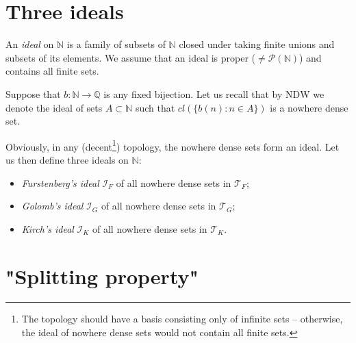 \documentclass{amsart}
\theoremstyle{definition}
\theoremstyle{definition}
\newcommand{\N}{{\mathbb N}}
\newcommand{\Q}{{\mathbb Q}}
\newcommand{\I}{\mathcal I}
\newcommand{\T}{\mathcal{T}}
\begin{document}

\section*{Three ideals}

An \emph{ideal} on $\N$ is a family of subsets of $\N$ closed under taking finite unions and subsets of its elements. We assume that an ideal is proper ($\neq \mathcal{P}(\N)$) and contains all finite sets.



Suppose that $b\colon\N\to\Q$ is any fixed bijection.
Let us recall that by $\mathrm{NDW}$ we denote the ideal of sets
$A \subset \N$ such that $\mathit{cl}(\lbrace b(n)\colon n \in A\rbrace)$
is a nowhere dense set.

Obviously, in any (decent\footnote{The topology should have a basis consisting only of infinite sets -- otherwise, the ideal of nowhere dense sets would not contain all finite sets.}) topology, the nowhere dense sets form an ideal. Let us then define three ideals on $\N$:
\begin{itemize}
\item \emph{Furstenberg's ideal} $\I_F$ of all nowhere dense sets in $\T_F$;
\item \emph{Golomb's ideal} $\I_G$ of all nowhere dense sets in $\T_G$;
\item \emph{Kirch's ideal} $\I_K$ of all nowhere dense sets in $\T_K$.
\end{itemize}


\section*{"Splitting property"}


\end{document}
